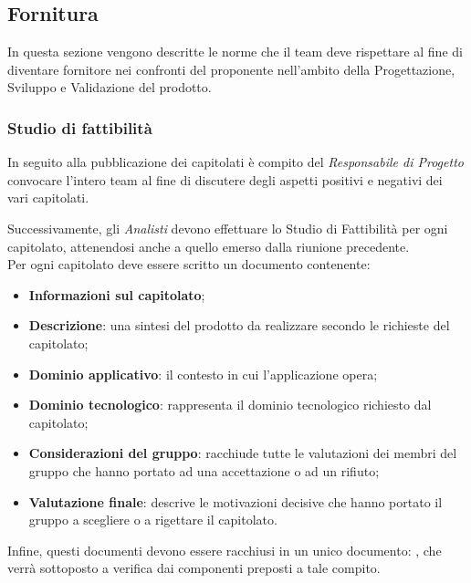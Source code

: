 \subsection{Fornitura}
In questa sezione vengono descritte le norme che il team deve rispettare al fine di diventare fornitore nei confronti del proponente nell'ambito della Progettazione, Sviluppo e Validazione del prodotto.
\subsubsection{Studio di fattibilità}
In seguito alla pubblicazione dei capitolati è compito del \textit{Responsabile di Progetto} convocare l'intero team al fine di discutere degli aspetti positivi e negativi dei vari capitolati.

Successivamente, gli \textit{Analisti} devono effettuare lo Studio di Fattibilità per ogni capitolato, attenendosi anche a quello emerso dalla riunione precedente.\\
Per ogni capitolato deve essere scritto un documento contenente:
\begin{itemize}
\item \textbf{Informazioni sul capitolato};
\item \textbf{Descrizione}: una sintesi del prodotto da realizzare secondo le richieste del capitolato;
\item \textbf{Dominio applicativo}: il contesto in cui l'applicazione opera;
\item \textbf{Dominio tecnologico}: rappresenta il dominio tecnologico richiesto dal capitolato;
\item \textbf{Considerazioni del gruppo}: racchiude tutte le valutazioni dei membri del gruppo che hanno portato ad una accettazione o ad un rifiuto;
\item \textbf{Valutazione finale}: descrive le motivazioni decisive che hanno portato il gruppo a scegliere o a rigettare il capitolato.
\end{itemize}
Infine, questi documenti devono essere racchiusi in un unico documento: \SdFv, che verrà sottoposto a verifica dai componenti preposti a tale compito.

